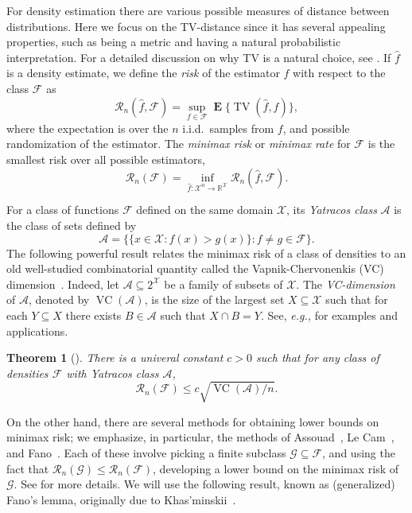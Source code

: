 \documentclass[letterpaper]{amsart}
\makeatletter
\newcommand{\sG}{\mathcal{G}}
\newcommand{\sX}{\mathcal{X}}
\newcommand{\sF}{\mathcal{F}}
\newcommand{\sR}{\mathcal{R}}
\newcommand{\sA}{\mathcal{A}}
\newcommand{\R}{\mathbb{R}}
\DeclareMathOperator{\E}{\mathbf{E}}
\DeclareMathOperator{\TV}{TV}
\DeclareMathOperator{\VC}{VC}
\newcommand*{\eg}{\emph{e.g.,}\@\xspace}
\newtheorem{thm}{Theorem}{\bfseries}{\itshape}
\newcommand{\thmlabel}[1]{\label{thm:#1}}
\numberwithin{thm}{section}
\theoremstyle{definition}
\theoremstyle{plain}
\makeatother
\begin{document}
For density estimation there are various possible measures of distance
between distributions.  Here we focus on the TV-distance since it has
several appealing properties, such as being a metric and having a
natural probabilistic interpretation.  For a detailed discussion on
why TV is a natural choice, see \cite[Chapter~5]{devroye-lugosi}.  If
$\hat{f}$ is a density estimate, we define the \emph{risk} of the
estimator $\hat{f}$ with respect to the class $\sF$ as
\[
  \sR_n(\hat{f}, \sF) = \sup_{f \in \sF} \E\{ \TV(\hat{f}, f) \} ,
\]
where the expectation is over the $n$ i.i.d.\ samples from $f$, and
possible randomization of the estimator.  The \emph{minimax risk} or
\emph{minimax rate} for $\sF$ is the smallest risk over all possible
estimators,
\[
  \sR_n(\sF) = \inf_{\hat{f} \colon \sX^n \to \R^{\sX}} \sR_n(\hat{f}, \sF) .
\]


For a class of functions $\sF$ defined on the same domain $\sX$, its
\emph{Yatracos class} $\sA$ is the class of sets defined by
\[
  \sA = \Big\{\{x \in \sX \colon f(x) > g(x)\} \colon f \neq g \in \sF\Big\} .
\]
The following powerful result relates the minimax risk of a class of
densities to an old well-studied combinatorial quantity called the
Vapnik-Chervonenkis (VC) dimension~\cite{vapnik-cherv}.  Indeed, let
$\sA \subseteq 2^{\sX}$ be a family of subsets of $\sX$.  The
\emph{VC-dimension} of $\sA$, denoted by $\VC(\sA)$, is the size of
the largest set $X \subseteq \sX$ such that for each $Y\subseteq X$
there exists $B \in \sA$ such that $X \cap B = Y$.  See, \eg
\cite[Chapter~4]{devroye-lugosi} for examples and applications.
\begin{thm}[]\thmlabel{risk-vc}
  There is a univeral constant $c > 0$ such that for any class of
  densities $\sF$ with Yatracos class $\sA$,
  \[
    \sR_n(\sF) \le c \sqrt{\VC(\sA)/n} .
  \]
\end{thm}

On the other hand, there are several methods for obtaining lower
bounds on minimax risk; we emphasize, in particular, the methods of
Assouad~\cite{assouad}, Le Cam~\cite{lecam-1, lecam-2}, and
Fano~\cite{has-fano}. Each of these involve picking a finite subclass
$\sG \subseteq \sF$, and using the fact that
$\sR_n(\sG) \le \sR_n(\sF)$, developing a lower bound on the minimax
risk of $\sG$. See \cite{devroye-course, devroye-lugosi, yu-survey}
for more details. We will use the following result, known as
(generalized) Fano's lemma, originally due to
Khas'minskii~\cite{has-fano}.
\end{document}
